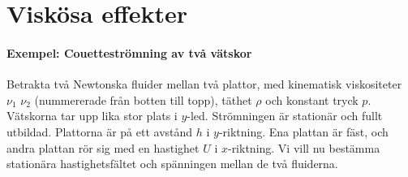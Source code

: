 \section{Viskösa effekter}

\paragraph{Exempel: Couetteströmning av två vätskor}
Betrakta två Newtonska fluider mellan två plattor, med kinematisk viskositeter $\nu_{1}$ $\nu_{2}$ (nummererade från botten till topp), täthet $\rho$ och konstant tryck $p$. Vätskorna tar upp lika stor plats i $y$-led. Strömningen är stationär och fullt utbildad. Plattorna är på ett avstånd $h$ i $y$-riktning. Ena plattan är fäst, och andra plattan rör sig med en hastighet $U$ i $x$-riktning. Vi vill nu bestämma stationära hastighetsfältet och spänningen mellan de två fluiderna.

